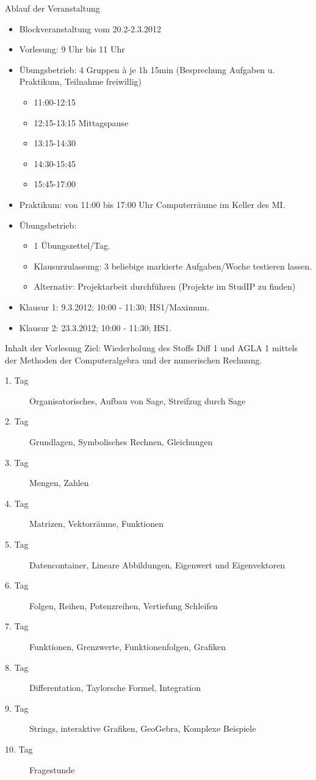 \documentclass[notes=hide,hyperref={dvipdfmx,pdfpagelabels=false}]{beamer}
\begin{document}
\begin{frame}{Ablauf der Veranstaltung}
\begin{itemize}
\item Blockveranstaltung vom  20.2-2.3.2012
\item \alert{Vorlesung:} 9 Uhr bis 11 Uhr
\item \alert{Übungsbetrieb}: 4 Gruppen \`a je 1h 15min (Besprechung Aufgaben u. Praktikum, Teilnahme freiwillig)
\begin{itemize}
\item 11:00-12:15 	
\item 12:15-13:15 Mittagspause
\item 13:15-14:30 
\item 14:30-15:45
\item 15:45-17:00 
\end{itemize}
\item \alert{Praktikum:} von 11:00 bis 17:00 Uhr Computerräume im Keller des MI.
\item \alert{Übungsbetrieb:}
\begin{itemize}
\item 1 Übungszettel/Tag.
\item Klausurzulassung: 3 beliebige markierte Aufgaben/Woche testieren lassen. 
\item Alternativ: Projektarbeit durchführen (Projekte im StudIP zu finden)
\end{itemize}
\item \alert{Klausur 1:} 9.3.2012; 10:00 - 11:30; HS1/Maximum.
\item \alert{Klausur 2:} 23.3.2012; 10:00 - 11:30; HS1.
\end{itemize}
\end{frame}

\begin{frame}{Inhalt der Vorlesung}
\alert{Ziel:} Wiederholung des Stoffs Diff 1 und AGLA 1 mittels der Methoden der Computeralgebra und der numerischen Rechnung.
\begin{description}
 \item[1. Tag]Organisatorisches, Aufbau von Sage, Streifzug durch Sage
\item [2. Tag] Grundlagen, Symbolisches Rechnen, Gleichungen
\item [3. Tag] Mengen, Zahlen
\item [4. Tag] Matrizen, Vektorräume, Funktionen
\item [5. Tag] Datencontainer, Lineare Abbildungen, Eigenwert und Eigenvektoren
\item [6. Tag] Folgen, Reihen, Potenzreihen, Vertiefung Schleifen
\item [7. Tag] Funktionen, Grenzwerte, Funktionenfolgen, Grafiken
\item [8. Tag] Differentation, Taylorsche Formel, Integration
\item [9. Tag] Strings, interaktive Grafiken, GeoGebra, Komplexe Beispiele
\item [10. Tag] Fragestunde
\end{description}
\end{frame}
\end{document}
